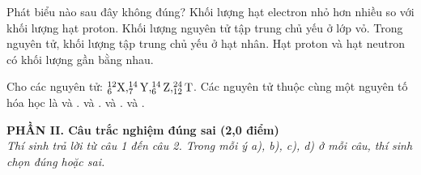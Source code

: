 \documentclass[11pt,a4paper]{article}
\begin{document}
\begin{ex}
Phát biểu nào sau đây không đúng?
\choice
{Khối lượng hạt electron nhỏ hơn nhiều so với khối lượng hạt proton.}
{\True Khối lượng nguyên tử tập trung chủ yếu ở lớp vỏ.}
{Trong nguyên tử, khối lượng tập trung chủ yếu ở hạt nhân.}
{Hạt proton và hạt neutron có khối lượng gần bằng nhau.}

\end{ex}
\begin{ex}
Cho các nguyên tử: $^{12}_6\ce{X}, ^{14}_7\ce{Y}, ^{14}_6\ce{Z}, ^{24}_{12}\ce{T}$. Các nguyên tử thuộc cùng một nguyên tố hóa học là
\choice
{\True {} và .}
{ và .}
{ và .}
{ và .}

\end{ex}
\vspace{4pt}
\noindent
{\color{mainGreen}\textbf{\large PHẦN II. Câu trắc nghiệm đúng sai (2,0 điểm)}}\\
\textit{\small Thí sinh trả lời từ câu 1 đến câu 2. Trong mỗi ý a), b), c), d) ở mỗi câu, thí sinh chọn đúng hoặc sai.}
\vspace{2pt}
\end{document}
